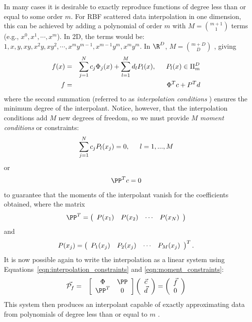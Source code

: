 \documentclass{report}
\begin{document}
{%
In many cases it is desirable to exactly reproduce functions of degree less than or equal to some order $m$. For RBF scattered data interpolation in one dimension, this can be achieved by adding a polynomial of order $m$ with $M =$${m+1}\choose{1}$ terms (e.g., $x^0, x^1, \cdots, x^{m}$). In 2D, the terms would be: $1, x, y, xy, x^2y, xy^2, \cdots, x^{m}y^{m-1}, x^{m-1}y^{m}, x^my^m$. In $\R^D$, $M =$${m+D}\choose{D}$ \cite{Iske:2004}, giving
\begin{eqnarray}
f(x) & = & \sum_{j=1}^{N} c_{j}  \Phi_j(x)  +  \sum_{l=1}^{M} d_{l} P_l(x),  \hskip1.5em  P_l(x) \in \Pi^{D}_{m} \\
f & = & \Phi^T c + P^T d
\label{eqn:interpolation_constraints}
\end{eqnarray}
where the second summation (referred to as \emph{interpolation conditions} \cite{Iske:2004}) ensures the minimum degree of the interpolant.  Notice, however, that the interpolation conditions add $M$ new degrees of freedom, so we must provide $M$ \emph{moment conditions} or constraints:
$$
\sum_{j=1}^{N} c_{j} P_l(x_j) = 0,  \hskip1.5em  l=1,..., M 
$$
or 
$$
\PP^T {c}  = {0} 
\label{eqn:moment_constraints}
$$
to guarantee that the moments of the interpolant vanish for the coefficients obtained, where the matrix
$$ \PP^T = \parray{cccc}{P(x_1) & P(x_2) & \cdots & P(x_N)}  $$
and 
$$ P(x_j) = \parray{cccc}{P_1(x_j) & P_2(x_j) & \cdots & P_M(x_j)}^T . $$
It is now possible again to write the interpolation as a linear system using Equations~\ref{eqn:interpolation_constraints} and \ref{eqn:moment_constraints}:%
\begin{eqnarray}
\vec{\mathcal{P}_f} & = & \left[ \begin{array}{c c} 
	\Phi & \PP \\
	\PP^T & 0
	\end{array} \right] \left( \begin{array}{c}
							\vec{c} \\
							\vec{d}
							 \end{array}
						 \right) = \left( \begin{array}{c}
							\vec{f} \\
							0
							 \end{array}
						 \right) 
\end{eqnarray}
This system then produces an interpolant capable of exactly approximating data from polynomials of degree less than or equal to $m$ \cite{Fasshauer:2007}. 

}
\end{document}
